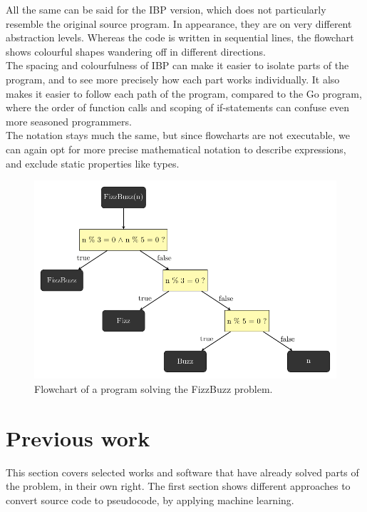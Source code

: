 All the same can be said for the IBP version, which does not particularly resemble the original source program. In appearance, they are on very different abstraction levels. Whereas the code is written in sequential lines, the flowchart shows colourful shapes wandering off in different directions. \\

The spacing and colourfulness of IBP can make it easier to isolate parts of the program, and to see more precisely how each part works individually. It also makes it easier to follow each path of the program, compared to the Go program, where the order of function calls and scoping of if-statements can confuse even more seasoned programmers. \\

The notation stays much the same, but since flowcharts are not executable, we can again opt for more precise mathematical notation to describe expressions, and exclude static properties like types.

\begin{figure}[ht]
    \centering
    \includegraphics[scale=.75]{assets/chapter3/FizzBuzzTikZ.pdf}
    \caption{Flowchart of a program solving the FizzBuzz problem.}
    \label{FizzBuzzTikZ.}
\end{figure}

\section{Previous work}

This section covers selected works and software that have already solved parts of the problem, in their own right. The first section shows different approaches to convert source code to pseudocode, by applying machine learning. \\

